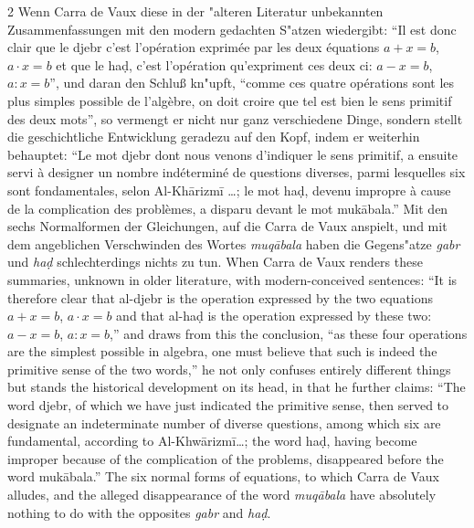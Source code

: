 \documentclass[10pt,a4paper]{article}
\renewcommand{\switchcolumn}{\syncronize\nointerlineskip\columnbreak}
\newcommand{\enquote}[1]{``#1''}
\begin{document}
\begin{paracol}{2}
Wenn Carra de Vaux diese in der "alteren Literatur unbekannten Zusammenfassungen mit den modern gedachten S"atzen wiedergibt: \enquote{Il est donc clair que le djebr c'est l'op\'eration exprim\'ee par les deux \'equations $a + x = b$, $a \cdot x = b$ et que le ha\d{d}, c'est l'op\'eration qu'expriment ces deux ci: $a - x = b$, $a : x = b$}, und daran den Schlu\ss{} kn"upft, \enquote{comme ces quatre op\'erations sont les plus simples possible de l'alg\`ebre, on doit croire que tel est bien le sens primitif des deux mots}, so vermengt er nicht nur ganz verschiedene Dinge, sondern stellt die geschichtliche Entwicklung geradezu auf den Kopf, indem er weiterhin behauptet: \enquote{Le mot djebr dont nous venons d'indiquer le sens primitif, a ensuite servi \`a designer un nombre ind\'etermin\'e de questions diverses, parmi lesquelles six sont fondamentales, selon Al-Kh\=arizm\=i \ldots{}; le mot ha\d{d}, devenu impropre \`a cause de la complication des probl\`emes, a disparu devant le mot muk\=abala.} Mit den sechs Normalformen der Gleichungen, auf die Carra de Vaux anspielt, und mit dem angeblichen Verschwinden des Wortes \textit{muq\=abala} haben die Gegens"atze \textit{gabr} und \textit{ha\d{d}} schlechterdings nichts zu tun.
\switchcolumn
When Carra de Vaux renders these summaries, unknown in older literature, with modern-conceived sentences: ``It is therefore clear that al-djebr is the operation expressed by the two equations $a + x = b$, $a \cdot x = b$ and that al-ha\d{d} is the operation expressed by these two: $a - x = b$, $a : x = b$,'' and draws from this the conclusion, ``as these four operations are the simplest possible in algebra, one must believe that such is indeed the primitive sense of the two words,'' he not only confuses entirely different things but stands the historical development on its head, in that he further claims: ``The word djebr, of which we have just indicated the primitive sense, then served to designate an indeterminate number of diverse questions, among which six are fundamental, according to Al-Khw\=arizm\={i}\ldots; the word ha\d{d}, having become improper because of the complication of the problems, disappeared before the word muk\=abala.'' The six normal forms of equations, to which Carra de Vaux alludes, and the alleged disappearance of the word \textit{muq\=abala} have absolutely nothing to do with the opposites \textit{gabr} and \textit{ha\d{d}}.
\end{paracol}
\end{document}
